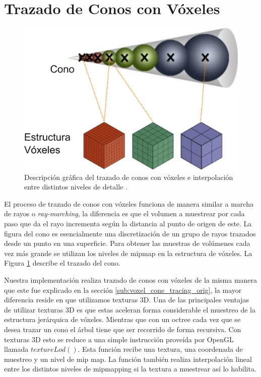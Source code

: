 \section{Trazado de Conos con Vóxeles} %

\label{sec:trazado_de_conos_con_voxeles}

\begin{figure}
	\includegraphics[width=0.95\linewidth]{media/vct_explain.png}
	\caption{Descripción gráfica del trazado de conos con vóxeles e interpolación entre distintos niveles de detalle \cite{Oliver:2012:UEE:2341836.2341909}.}
	\label{fig:vct_explain}
\end{figure}

El proceso de trazado de conos con vóxeles funciona de manera similar a marcha de rayos o \emph{ray-marching}, la diferencia es que el volumen a muestrear por cada paso que da el rayo incrementa según la distancia al punto de origen de este. La figura del cono es esencialmente una discretización de un grupo de rayos trazados desde un punto en una superficie. Para obtener las muestras de volúmenes cada vez más grande se utilizan los niveles de mipmap en la estructura de vóxeles. La Figura \ref{fig:vct_explain} describe el trazado del cono.

Nuestra implementación realiza trazado de conos con vóxeles de la misma manera que este fue explicado en la sección \ref{sub:voxel_cone_tracing_orig}, la mayor diferencia reside en que utilizamos texturas 3D. Una de las principales ventajas de utilizar texturas 3D es que estas aceleran forma considerable el muestreo de la estructura jerárquica de vóxeles. Mientras que con un octree cada vez que se desea trazar un cono el árbol tiene que ser recorrido de forma recursiva. Con texturas 3D esto se reduce a una simple instrucción proveída por OpenGL llamada $textureLod()$. Esta función recibe una textura, una coordenada de muestreo y un nivel de mip map. La función también realiza interpolación lineal entre los distintos niveles de mipmapping si la textura a muestrear así lo habilita.
